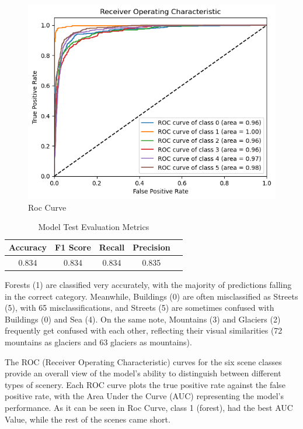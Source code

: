 \begin{figure}[H]
    \centering
    \includegraphics[width=1\linewidth]{images/modelo_aula_roc.png}
    \caption{Roc Curve}
    \label{fig:rocincial}
\end{figure}

\begin{table}[H]
    \centering
    \caption{Model Test Evaluation Metrics} 
    \begin{tabular}{||c|c|c|c|c||} 
        \hline
        Accuracy & F1 Score & Recall & Precision \\
        \hline\hline
        0.834 & 0.834 & 0.834 & 0.835 \\
        \hline
    \end{tabular}
    \label{tab:tab_LogReg}
\end{table}

Forests (1) are classified very accurately, with the majority of predictions falling in the correct category. Meanwhile, Buildings (0) are often misclassified as Streets (5), with 65 misclassifications, and Streets (5) are sometimes confused with Buildings (0) and Sea (4). On the same note, Mountains (3) and Glaciers (2) frequently get confused with each other, reflecting their visual similarities (72 mountains as glaciers and 63 glaciers as mountains).

The ROC (Receiver Operating Characteristic) curves for the six scene classes provide an overall view of the model’s ability to distinguish between different types of scenery. Each ROC curve plots the true positive rate against the false positive rate, with the Area Under the Curve (AUC) representing the
model’s performance. As it can be seen in Roc Curve, class 1 (forest), had the best AUC Value, while the rest of the scenes came short. 

